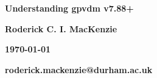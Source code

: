 \color{white}





\begin{titlepage}
   \begin{center}
      \Huge\textbf{Understanding gpvdm v7.88+}
   \end{center}

   \begin{center}
      \large\textbf{Roderick C. I. MacKenzie}
   \end{center}

   \begin{center}
      \large\textbf{\monthdayyeardate\today}
   \end{center}
   \begin{center}
      \large\textbf{roderick.mackenzie@durham.ac.uk}
   \end{center}

\addtolength{\wpXoffset}{-10cm}
\end{titlepage}

\setcounter{question}{0}




\color{black}


\newpage

